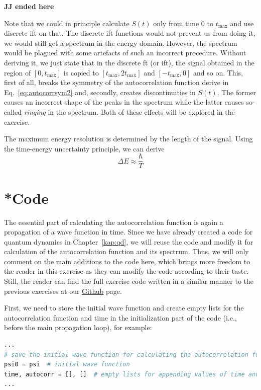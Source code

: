 \textbf{JJ ended here}



\hline
Note that we could in principle calculate $S(t)$ only from time 0 to $t_\mathrm{max}$ and use discrete \acrshort{ift} on that. The discrete \acrshort{ift} functions would not prevent us from doing it, we would still get a spectrum in the energy domain. However, the spectrum would be plagued with some artefacts of such an incorrect procedure. Without deriving it, we just state that in the discrete \acrshort{ft} (or \acrshort{ift}), the signal obtained in the region of $[0, t_\mathrm{max}]$ is copied to $[t_\mathrm{max}, 2t_\mathrm{max}]$ and $[-t_\mathrm{max}, 0]$ and so on. This, first of all, breaks the symmetry of the autocorrelation function derive in Eq.~\eqref{eq:autocorrsym2} and, secondly, creates discontinuities in $S(t)$. The former causes an incorrect shape of the peaks in the spectrum while the latter causes so-called \textit{ringing} in the spectrum. Both of these effects will be explored in the exercise.

\hline
The maximum energy resolution is determined by the length of the signal. Using the time-energy uncertainty principle, we can derive
\begin{equation}
    \Delta E \approx \frac{\hbar}{T}
\end{equation}


\section{*Code}

The essential part of calculating the autocorrelation function is again a propagation of a wave function in time. Since we have already created a code for quantum dynamics in Chapter~\ref{kap:qd}, we will reuse the code and modify it for calculation of the autocorrelation function and its spectrum. Thus, we will only comment on the main additions to the code here, which brings more freedom to the reader in this exercise as they can modify the code according to their taste. Still, the reader can find the full exercise code written in a similar manner to the previous exercises at our \href{https://github.com/PHOTOX/QM-hands-on/blob/main/codes/exercises/autocorr.py}{Github} page.

First, we need to store the initial wave function and create empty lists for the autocorrelation function and time in the initialization part of the code (i.e., before the main propagation loop), for example:
\begin{lstlisting}[language=Python, style=mystyle2]
...
# save the initial wave function for calculating the autocorrelation function
psi0 = psi  # initial wave function
time, autocorr = [], []  # empty lists for appending values of time and autocorrelation function
...
\end{lstlisting}

